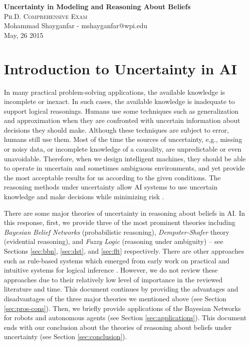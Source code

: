 \documentclass[11pt]{article}
\begin{document}

\begin{center}
{\LARGE{\textbf{Uncertainty in Modeling and Reasoning About Beliefs}}} \\
\Large\textsc{Ph.D. Comprehensive Exam} \\[1em]
\large\textnormal{Mohammad Shayganfar - mshayganfar@wpi.edu} \\
\large\textnormal{May, 26 2015}
\end{center}

\section{Introduction to Uncertainty in AI}

In many practical problem-solving applications, the available knowledge is
incomplete or inexact. In such cases, the available knowledge is inadequate to
support logical reasonings. Humans use some techniques such as generalization
and approximation when they are confronted with uncertain information about 
decisions they should make. Although these techniques are subject to error,
humans still use them. Most of the time the sources of uncertainty, e,g.,
missing or noisy data, or incomplete knowledge of a causality, are unpredictable
or even unavoidable. Therefore, when we design intelligent machines, they
should be able to operate in uncertain and sometimes ambiguous environments, and
yet provide the most acceptable results for us according to the given
conditions. The reasoning methods under uncertainty allow AI systems to use
uncertain knowledge and make decisions while minimizing risk
\cite{tanimoto:ai-lisp}.

There are some major theories of uncertainty in reasoning about beliefs in AI.
In this response, first, we provide three of the most prominent theories
including \textit{Bayesian Belief Networks} (probabilistic reasoning),
\textit{Dempster-Shafer} theory (evidential reasoning), and \textit{Fuzzy Logic}
(reasoning under ambiguity) -- see Sections \ref{sec:bbn}, \ref{sec:dst}, and
\ref{sec:flt} respectively. There are other approaches such as rule-based
systems which emerged from early work on practical and intuitive systems for
logical inference \cite{russell:ai-modern}. However, we do not review these
approaches due to their relatively low level of importance in the reviewed
literature and time. This document continues by providing the advantages and
disadvantages of the three major theories we mentioned above (see Section
\ref{sec:pros-cons}). Then, we briefly provide applications of the Bayesian
Networks for robots and autonomous agents (see Section \ref{sec:applications}).
This document ends with our conclusion about the theories of reasoning about
beliefs under uncertainty (see Section \ref{sec:conclusion}).
\end{document}
